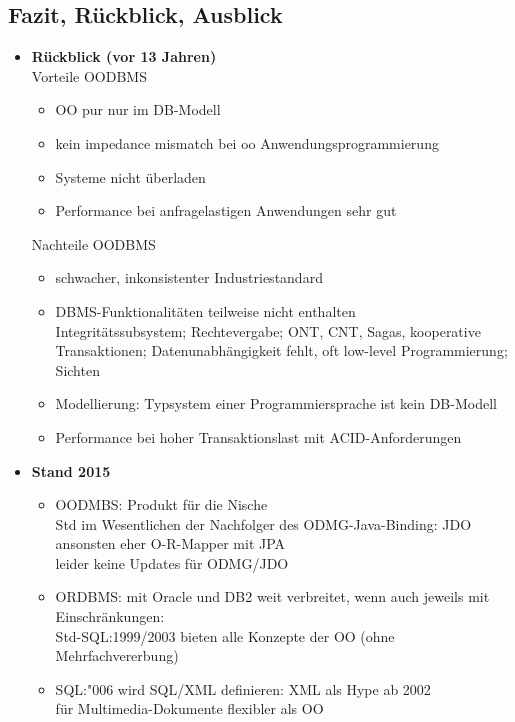 \subsection{Fazit, Rückblick, Ausblick}
\begin{itemize}
	\item \textbf{Rückblick (vor 13 Jahren)}\\
	Vorteile OODBMS
	\begin{itemize}
		\item OO pur nur im DB-Modell
		\item kein impedance mismatch bei oo Anwendungsprogrammierung
		\item Systeme nicht überladen
		\item Performance bei anfragelastigen Anwendungen sehr gut
	\end{itemize}
	Nachteile OODBMS
	\begin{itemize}
		\item schwacher, inkonsistenter Industriestandard
		\item DBMS-Funktionalitäten teilweise nicht enthalten\\
		Integritätssubsystem; Rechtevergabe; ONT, CNT, Sagas, kooperative Transaktionen; Datenunabhängigkeit fehlt, oft low-level Programmierung; Sichten
		\item Modellierung: Typsystem einer Programmiersprache ist kein DB-Modell
		\item Performance bei hoher Transaktionslast mit ACID-Anforderungen
	\end{itemize}
	
	\item \textbf{Stand 2015}
	\begin{itemize}
		\item OODMBS: Produkt für die Nische\\
		Std im Wesentlichen der Nachfolger des ODMG-Java-Binding: JDO\\
		ansonsten eher O-R-Mapper mit JPA\\
		leider keine Updates für ODMG/JDO
		
		\item ORDBMS: mit Oracle und DB2 weit verbreitet, wenn auch jeweils mit Einschränkungen:\\
		Std-SQL:1999/2003 bieten alle Konzepte der OO (ohne Mehrfachvererbung)
		\item SQL:"006 wird SQL/XML definieren: XML als Hype ab 2002\\
		für Multimedia-Dokumente flexibler als OO
	\end{itemize}
\end{itemize}